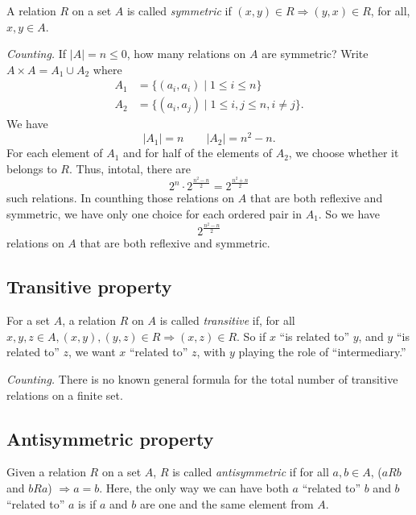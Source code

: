 \documentclass[11pt]{article}
\begin{document}
    A relation $R$ on a set $A$ is called \emph{symmetric} if \((x,y) \in R \Rightarrow (y,x) \in R\), for all, \(x,y \in A\).

    \vspace{1em}

    \emph{Counting.} If \(|A| = n \leq 0\), how many relations on $A$ are symmetric? Write \(A \times A = A_1 \cup A_2\) where
    \begin{align*}
        A_1 &= \{(a_i, a_i) \mid 1 \leq i \leq n\} \\
        A_2 &= \{(a_i, a_j) \mid 1 \leq i, j \leq n, i \neq j\}.
    \end{align*}
    We have \[|A_1| = n \qquad |A_2| = n^2 - n.\] For each element of \(A_1\) and for half of the elements of \(A_2\), we choose whether it belongs to $R$. Thus, intotal, there are \[2^n \cdot 2^{\frac{n^2-n}{2}} = 2^{\frac{n^2+n}{2}}\] such relations. In counthing those relations on $A$ that are both reflexive and symmetric, we have only one choice for each ordered pair in \(A_1\). So we have \[2^{\frac{n^2 - n}{2}}\] relations on $A$ that are both reflexive and symmetric.

    \subsection{Transitive property}

    For a set $A$, a relation $R$ on $A$ is called \emph{transitive} if, for all \(x,y,z \in A, (x,y), (y,z) \in R \Rightarrow (x,z) \in R\). So if $x$ ``is related to'' $y$, and $y$ ``is related to'' $z$, we want $x$ ``related to'' $z$, with $y$ playing the role of ``intermediary.''

    \vspace{1em}

    \emph{Counting.} There is no known general formula for the total number of transitive relations on a finite set.

    \subsection{Antisymmetric property}

    Given a relation $R$ on a set $A$, $R$ is called \emph{antisymmetric} if for all \(a,b \in A\), (\(a R b\) and \(b R a\)) \(\Rightarrow a = b.\) Here, the only way we can have both $a$ ``related to'' $b$ and $b$ ``related to'' $a$ is if $a$ and $b$ are one and the same element from $A$.

    \vspace{1em}
\end{document}
